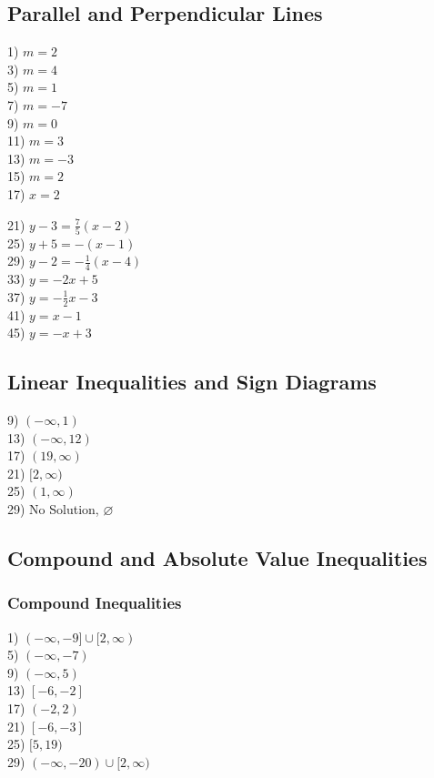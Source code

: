 \documentclass[12pt]{book}
\theoremstyle{definition}
\begin{document}
\subsection*{Parallel and Perpendicular Lines}
\begin{multicols}{5}
1) $m=2$\\
3) $m=4$\\
5) $m=1$\\
7) $m=-7$\\
9) $m=0$\\
11) $m=3$\\
13) $m=-3$\\
15) $m=2$\\
17) $x=2$\\
\end{multicols}
\begin{multicols}{3}
21) $y-3=\frac{7}{5}(x-2)$\\
25) $y+5=-(x-1)$\\
29) $y-2=-\frac{1}{4}(x-4)$\\
33) $y=-2x+5$\\
37) $y=-\frac{1}{2}x-3$\\
41) $y=x-1$\\
45) $y=-x+3$
\end{multicols}
\subsection*{Linear Inequalities and Sign Diagrams}
\begin{multicols}{3}
9) $(-\infty,1)$\\
13) $(-\infty,12)$\\
17) $(19,\infty)$\\
21) $[2,\infty)$\\
25) $(1,\infty)$\\
29) No Solution, $\varnothing$
\end{multicols}
\subsection*{Compound and Absolute Value Inequalities}
\subsubsection*{Compound Inequalities}
\begin{multicols}{4}
1) $(-\infty,-9]\cup[2,\infty)$\\
5) $(-\infty,-7)$\\
9) $(-\infty,5)$\\
13) $[-6,-2]$\\
17) $(-2,2)$\\
21) $[-6,-3]$\\
25) $[5,19)$\\
29) $(-\infty,-20)\cup[2,\infty)$
\end{multicols}
\end{document}
